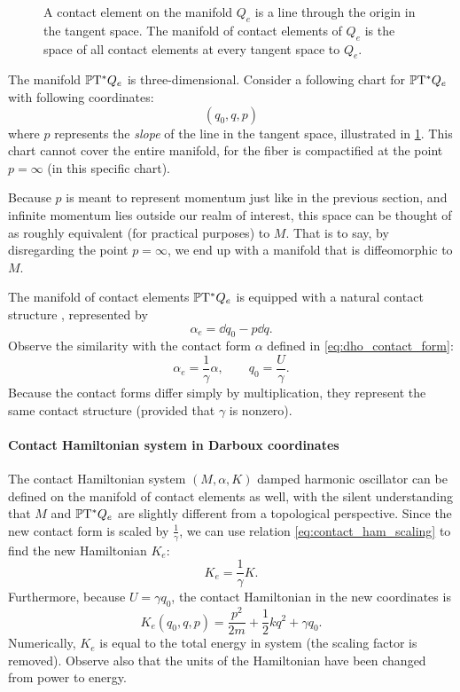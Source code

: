 \begin{figure}
    \centering
    
    \caption{A contact element on the manifold $Q_e$ is a line through the origin in the tangent space. The manifold of contact elements of $Q_e$ is the space of all contact elements at every tangent space to $Q_e$.}
    \label{fig:manifold_contact_elements}
\end{figure}

The manifold $\mathbb{P}\mathrm{T}^* Q_e$ is three-dimensional. Consider a following chart for $\mathbb{P}\mathrm{T}^* Q_e$ with following coordinates:
$$ (q_0, q, p)$$
where $p$ represents the \emph{slope} of the line in the tangent space, illustrated in \cref{fig:manifold_contact_elements}. This chart cannot cover the entire manifold, for the fiber is compactified at the point $p = \infty$ (in this specific chart). 

Because $p$ is meant to represent momentum just like in the previous section, and infinite momentum lies outside our realm of interest, this space can be thought of as roughly equivalent (for practical purposes) to $M$. That is to say, by disregarding the point $p = \infty$, we end up with a manifold that is diffeomorphic to $M$.

The manifold of contact elements $\mathbb{P}\mathrm{T}^* Q_e$ is equipped with a natural contact structure \cite{Arnold1989}, represented by
\begin{equation}
    \alpha_e = \dd{q}_0 - p\dd{q}.
\end{equation}
Observe the similarity with the contact form $\alpha$ defined in \cref{eq:dho_contact_form}: 
$$
    \alpha_e = \frac{1}{\gamma}\alpha, \qquad q_0 = \frac{U}{\gamma}. 
$$
Because the contact forms differ simply by multiplication, they represent the same contact structure (provided that $\gamma$ is nonzero).

\paragraph{Contact Hamiltonian system in Darboux coordinates} The contact Hamiltonian system $(M, \alpha, K)$ damped harmonic oscillator can be defined on the manifold of contact elements as well, with the silent understanding that $M$ and $\mathbb{P}\mathrm{T}^* Q_e$ are slightly different from a topological perspective. Since the new contact form is scaled by $\tfrac{1}{\gamma}$, we can use relation \cref{eq:contact_ham_scaling} to find the new Hamiltonian $K_e$:
$$ K_e = \frac{1}{\gamma} K. $$
Furthermore, because $U = \gamma q_0$, the contact Hamiltonian in the new coordinates is
\begin{equation}
    K_e(q_0, q, p) = \frac{p^2}{2m} + \frac{1}{2}kq^2 + \gamma q_0.
    \label{eq:dho_contact_hamiltonian_e}
\end{equation}
Numerically, $K_e$ is equal to the total energy in system (the scaling factor is removed). Observe also that the units of the Hamiltonian have been changed from power to energy.


